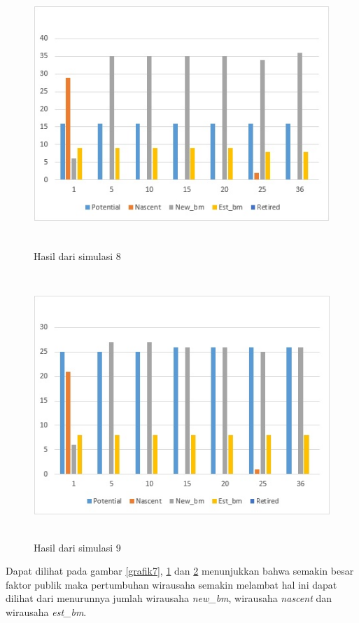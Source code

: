 	\begin{figure} [H]
	\centering  
	\includegraphics[width=12cm, height=10cm]{grafik8} 
		\caption[Hasil dari simulasi]{Hasil dari simulasi 8}
	\label{grafik8} 
\end{figure}

	\begin{figure} [H]
	\centering  
	\includegraphics[width=12cm, height=10cm]{grafik9} 
		\caption[Hasil dari simulasi]{Hasil dari simulasi 9}
	\label{grafik9} 
\end{figure}

Dapat dilihat pada gambar \ref{grafik7}, \ref{grafik8} dan \ref{grafik9} menunjukkan bahwa semakin besar faktor publik maka pertumbuhan wirausaha semakin melambat hal ini dapat dilihat dari menurunnya jumlah wirausaha \textit{new\_bm}, wirausaha \textit{nascent} dan wirausaha \textit{est\_bm}.
